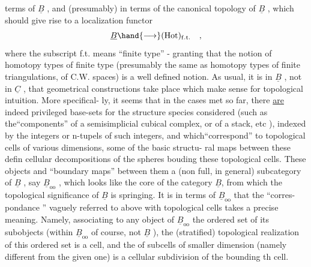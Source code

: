 
terms of $\underline{B}$ , and (presumably) in terms of the canonical topology of $\underline{B}$ ,
which should give rise to a localization functor
\[ \underline{B} \hand{\longrightarrow} (\mathrm{Hot})_{\mathrm{f.t.}} \quad , \]
where the subscript f.t. means ``finite type'' - granting that the notion
of homotopy types of finite type (presumably the same as homotopy types
of finite triangulations, of C.W. spaces) is a well defined notion.
As usual, it is in $\underline{B}$ , not in $\underline{C}$ , that geometrical constructions
take place which make sense for topological intuition. More specifical-%
ly, it seems that in the cases met so far, there \uline{are} indeed privileged
base-sets for the structure species considered (such as the``components''
of a semisimplicial  cubical complex, or of a stack, etc ), indexed
by the integers or n-tupels of such integers, and which``correspond'' to
topological cells of various dimensions,  some of the basic structu-%
ral maps between these defin cellular decompositions of the spheres
bouding these topological cells. These objects and ``boundary\hand{*} maps''
between them  a (non full, in general) subcategory of $\underline{B}$ , say $\underline{B}_{\mathrm{oo}}$ ,
which looks like the core of the category $\underline{B}$, from which the topological
significance of $\underline{B}$ is springing. It is in terms of $\underline{B}_{\mathrm{oo}}$ that the ``corres-%
pondance '' \hand{(}vaguely referred to above\hand{)} with topological cells takes a
precise meaning. Namely, associating to any object of $\underline{B}_{\mathrm{oo}}$ the ordered
set of its subobjects (within $\underline{B}_{\mathrm{oo}}$ of course, not $\underline{B}$ ), the 
(stratified) topological realization of this ordered set is a cell, and
the  of  subcells of smaller dimension (namely different from
the given one) is a cellular subdivision of the bounding th cell.

